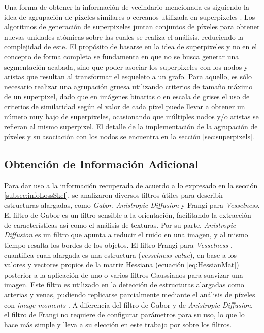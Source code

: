 Una forma de obtener la informaci\'on de vecindario mencionada es siguiendo la idea de agrupaci\'on de p\'ixeles similares o cercanos utilizada en superpixeles . Los algoritmos de generaci\'on de superpixeles juntan conjuntos de p\'ixeles para obtener nuevas unidades at\'omicas sobre las cuales se realiza el an\'alisis, reduciendo la complejidad de este. El prop\'osito de basarse en la idea de superpixeles y no en el concepto de forma completa se fundamenta en que no se busca generar una segmentaci\'on acabada, sino que poder asociar los superpixeles con los nodos y aristas que resultan al transformar el esqueleto a un grafo. Para aquello, es s\'olo necesario realizar una agrupaci\'on gruesa utilizando criterios de tama\~no m\'aximo de un superpixel, dado que en im\'agenes binarias o en escala de grises el uso de criterios de similaridad seg\'un el valor de cada p\'ixel puede llevar a obtener un n\'umero muy bajo de superpixeles, ocasionando que m\'ultiples nodos y/o aristas se refieran al mismo superpixel. El detalle de la implementaci\'on de la agrupaci\'on de p\'ixeles y su asociaci\'on con los nodos se encuentra en la secci\'on \ref{sec:superpixels}.


\subsection{Obtenci\'on de Informaci\'on Adicional}

Para dar uso a la informaci\'on recuperada de acuerdo a lo expresado en la secci\'on \ref{subsec:infoLossSkel}, se analizaron diversos filtros \'utiles para describir estructuras alargadas, como {\it Gabor}, {\it Anistropic Diffusion} y Frangi para {\it Vesselness}. El filtro de Gabor es un filtro sensible a la orientaci\'on, facilitando la extracci\'on de caracter\'isticas as\'i como el an\'alisis de texturas. Por su parte, {\it Anistropic Diffusion} es un filtro que apunta a reducir el ruido en una imagen, y al mismo tiempo resalta los bordes de los objetos. El filtro Frangi para {\it Vesselness} , cuantifica cuan alargada es una estructura ({\it vesselness value}), en base a los valores y vectores propios de la matriz Hessiana (ecuaci\'on \ref{eq:HessianMat}) posterior a la aplicaci\'on de uno o varios filtros Gaussianos para suavizar una imagen. Este filtro es utilizado en la detecci\'on de estructuras alargadas como arterias y venas, pudiendo replicarse parcialmente mediante el an\'alisis de p\'ixeles con {\it image moments} . 
A diferencia del filtro de Gabor y de {\it Anistropic Diffusion}, el filtro de Frangi no requiere de configurar par\'ametros para su uso, lo que lo hace m\'as simple y lleva a su elecci\'on en este trabajo por sobre los filtros.

